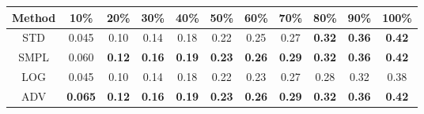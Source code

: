 \documentclass{standalone}
\begin{document}
\begin{tabular}{c|cccccccccc}
      \toprule
      Method & 10\% & 20\% & 30\% & 40\% & 50\% & 60\% & 70\% & 80\% & 90\% & 100\% \\
      \midrule
STD & 0.045 & 0.10 & 0.14 & 0.18 & 0.22 & 0.25 & 0.27 & \textbf{0.32} & \textbf{0.36} & \textbf{0.42}\\
SMPL & 0.060 & \textbf{0.12} & \textbf{0.16} & \textbf{0.19} & \textbf{0.23} & \textbf{0.26} & \textbf{0.29} & \textbf{0.32} & \textbf{0.36} & \textbf{0.42}\\
LOG & 0.045 & 0.10 & 0.14 & 0.18 & 0.22 & 0.23 & 0.27 & 0.28 & 0.32 & 0.38\\
ADV & \textbf{0.065} & \textbf{0.12} & \textbf{0.16} & \textbf{0.19} & \textbf{0.23} & \textbf{0.26} & \textbf{0.29} & \textbf{0.32} & \textbf{0.36} & \textbf{0.42}\\
  \bottomrule
\end{tabular}
\end{document}
